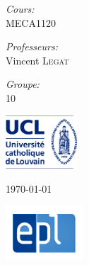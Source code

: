 \documentclass[a4paper,11pt]{article}
\begin{document}
\begin{titlepage}
\begin{minipage}{0.48\textwidth}
\begin{flushleft}
      \end{flushleft}
    \end{minipage}
    \begin{minipage}{0.48\textwidth}
      \begin{flushright} \large
        \textit{Cours:} \\
        MECA1120\\ \vspace{0.27cm}
       
        \textit{Professeurs:} \\
        Vincent \textsc{Legat}\\ \vspace{0.9cm}
        
        \textit{Groupe:} \\
        10
      \end{flushright}
    \end{minipage}

    \vfill

    \begin{minipage}{0.3\textwidth}
      \begin{flushleft}
        \includegraphics[height=2cm]{logo_UCL.jpeg}
      \end{flushleft}
    \end{minipage}
    \begin{minipage}{0.3\textwidth}
      \begin{center}
        {\large \today}
      \end{center}
    \end{minipage}
    \begin{minipage}{0.3\textwidth}
      \begin{flushright}
        \includegraphics[height=2cm]{logo_EPL.png}
      \end{flushright}
    \end{minipage}
\end{titlepage}
\end{document}

